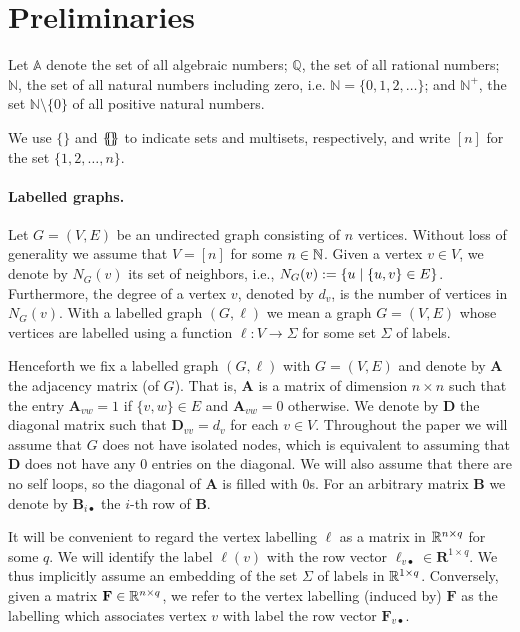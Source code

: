 \section{Preliminaries}
Let $\mathbb{A}$ denote the set of all algebraic numbers; $\mathbb{Q}$, the set of all rational numbers; $\mathbb{N}$, the set of all natural numbers including zero, i.e.
$\mathbb{N} = \{0,1,2,\dots\}$; and $\mathbb{N}^+$, the set $\mathbb{N} \setminus
\{0\}$ of all positive natural numbers.

We use $\{\!\}$ and $\{\!\!\{\! \}\!\!\}$ to indicate sets and multisets,
respectively, and write $[n]$ for the set $\{1,2,\ldots,n\}$.

\paragraph{Labelled graphs.}
Let $G=(V,E)$ be an undirected graph consisting of $n$ vertices. Without loss
of generality we assume that $V=[n]$ for some $n\in\mathbb{N}$. Given a vertex $v\in
V$, we denote by $N_G(v)$ its set of neighbors, i.e., $N_G(v):=\{u\mathrel{\mid}
\{u,v\}\in E\}$. Furthermore, the degree of a vertex $v$, denoted by $d_{v}$,
is the number of vertices in $N_G(v)$. With a labelled graph $(G,\pmb{\ell})$
we mean a graph $G=(V,E)$ whose vertices are labelled using a function
$\pmb{\ell}:V\to \Sigma$ for some set $\Sigma$ of labels. 

Henceforth we fix a labelled graph $(G,\pmb{\ell})$ with $G=(V,E)$ and denote
by $\mathbf{A}$ the adjacency matrix (of $G$). That is, $\mathbf{A}$ is a
matrix of dimension $n \times n$ such that the entry $\mathbf{A}_{vw}=1$ if
$\{v,w\}\in E$ and $\mathbf{A}_{vw}=0$ otherwise. We denote by $\mathbf{D}$
the diagonal matrix such that $\mathbf{D}_{vv}=d_v$ for each $v\in V$.
Throughout the paper we will assume that $G$ does not have isolated nodes,
which is equivalent to assuming that $\mathbf{D}$ does not have any $0$
entries on the diagonal. We will also assume that there are no self loops, so
the diagonal of $\mathbf{A}$ is filled with $0$s. For an arbitrary matrix
$\mathbf{B}$ we denote by $\mathbf{B}_{i\bullet}$ the $i$-th row of
$\mathbf{B}$.

It will be convenient to regard the vertex labelling $\pmb{\ell}$ as a matrix
in $\mathbb{R}^{n\times q}$ for some $q$. We will identify the label $\pmb{\ell}(v)$
with the row vector $\pmb{\ell}_{v\bullet}\in\mathbf{R}^{1\times q}$. We thus
implicitly assume an embedding of the set $\Sigma$ of labels in $\mathbb{R}^{1\times
q}$. Conversely, given a matrix $\mathbf{F} \in \mathbb{R}^{n \times q}$, we refer to
the vertex labelling (induced by) $\mathbf{F}$ as the labelling which
associates vertex $v$ with label the row vector $\mathbf{F}_{v\bullet}$.

